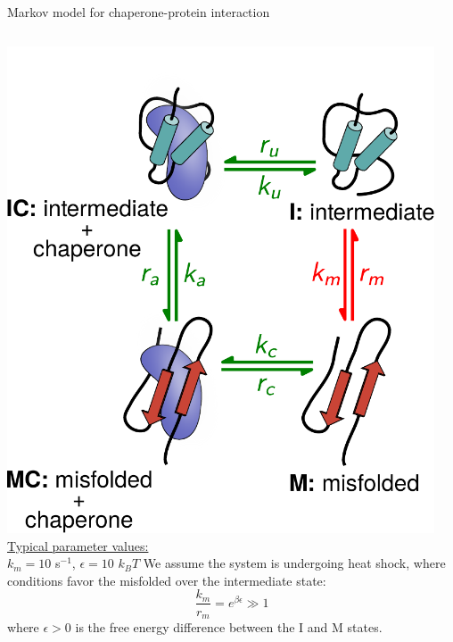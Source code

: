 \documentclass{beamer}
\begin{document}
\begin{frame}{Markov model for chaperone-protein interaction}

  \vspace{-1em}
  \begin{columns}[T]
    \centering
    \includegraphics[width=0.95\textwidth]{markov1.pdf}\\[0.5em]
    {\small{\color{blue} \underline{Typical parameter values:}\\ $k_m = 10$ s$^{-1}$, $\epsilon = 10$ $k_B T$}}
     \vspace{0.5in} {\small We assume the system is undergoing heat
    shock, where conditions favor the misfolded over the intermediate
    state:
    \[
    \frac{k_m}{r_m} = e^{\beta \epsilon} \gg 1
    \]
    where $\epsilon >0$ is the free energy difference between the I
    and M states.\\[1em]}

    
    \end{columns}
\end{frame}
\end{document}
